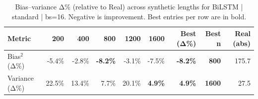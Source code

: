 \renewcommand{\arraystretch}{1.2}
\begin{table}[!t]
\centering
\footnotesize
\caption{Bias–variance Δ\% (relative to Real) across synthetic lengths for BiLSTM | standard | bs=16. Negative is improvement. Best entries per row are in bold.}
\label{tab:bvdelta_BiLSTM_standard_bs16}
\setlength{\tabcolsep}{5pt}
\begin{tabular}{lrrrrrrrr}
\toprule
Metric & 200 & 400 & 800 & 1200 & 1600 & Best (Δ\%) & Best n & Real (abs) \\
\midrule
Bias$^2$ (Δ\%) & -5.4\% & -2.8\% & \textbf{-8.2\%} & -3.1\% & -7.5\% & \textbf{-8.2\%} & \textbf{800} & 175.7 \\
Variance (Δ\%) & 22.5\% & 13.4\% & 7.7\% & 20.1\% & \textbf{4.9\%} & \textbf{4.9\%} & \textbf{1600} & 27.5 \\
\bottomrule
\end{tabular}

\end{table}
